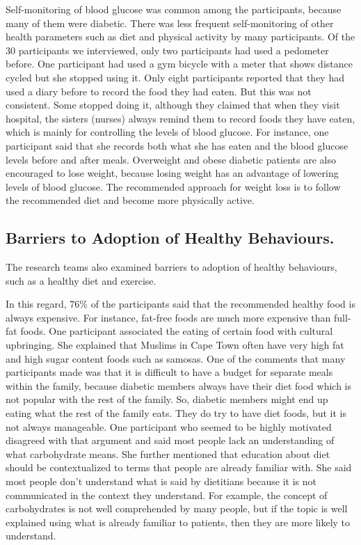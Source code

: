 Self-monitoring of blood glucose was common among the participants, because many of them were diabetic. There was less frequent self-monitoring of other health parameters such as diet and physical activity by many participants. Of the 30 participants we interviewed, only two participants had used a pedometer before.  One participant had used a gym bicycle with a meter that shows distance cycled but she stopped using it. Only eight participants reported that they had used a diary before to record the food they had eaten. But this was not consistent. Some stopped doing it, although they claimed that when they visit hospital, the sisters (nurses) always remind them to record foods they have eaten, which is mainly for controlling the levels of blood glucose. For instance, one participant said that she records both what she has eaten and the blood glucose levels before and after meals. Overweight and obese diabetic patients are also encouraged to lose weight, because losing weight has an advantage of lowering levels of blood glucose.  The recommended approach for weight loss is to follow the recommended diet and become more physically active. 
\subsection{Barriers to Adoption of Healthy Behaviours.}
The research teams also examined barriers to adoption of healthy behaviours, such as a healthy diet and exercise.

In this regard, 76\% of the participants said that the recommended healthy food is always expensive. For instance, fat-free foods are much more expensive than full-fat foods. One participant associated the eating of certain food with cultural upbringing. She explained that Muslims in Cape Town often have very high fat and high sugar content foods  such as samosas. One of the comments that many participants made was that it is difficult to have a budget for separate meals within the family, because diabetic members always have their diet food which is not popular with the rest of the family. So, diabetic members might end up eating what the rest of the family eats. They do try to have diet foods, but it is not always manageable. One participant who seemed to be highly motivated disagreed with that argument and said most people lack an understanding of what carbohydrate means. She further mentioned that education about diet should be contextualized to terms that people are already familiar with. She said most people don't understand what is said by dietitians because it is not communicated in the context they understand. For example, the concept of carbohydrates is not well comprehended by many people, but if the topic is well explained using what is already familiar to patients, then they are more likely to understand.

